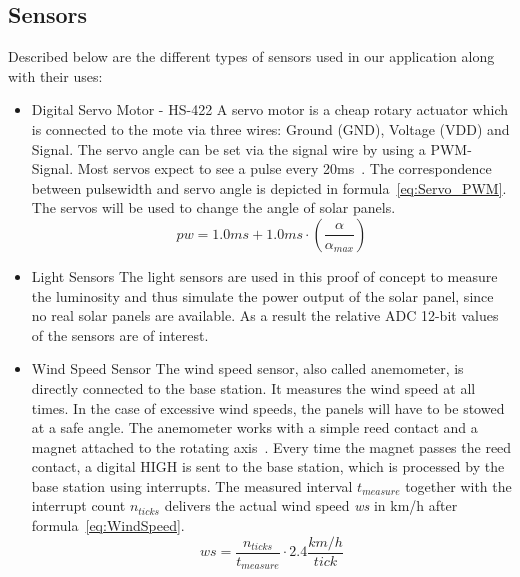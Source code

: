 \documentclass[conference]{IEEEtran}
\begin{document}
\subsection{Sensors}
Described below are the different types of sensors used in our application along with their uses:

\begin{itemize}
    \item Digital Servo Motor - HS-422\cite{servoMotor}\newline
        A servo motor is a cheap rotary actuator which is connected to the mote via three wires: Ground (GND), Voltage (VDD) and Signal. The servo angle can be set via the signal wire by using a PWM-Signal. Most servos expect to see a pulse every 20ms~\cite{howServoworks}. The correspondence between pulsewidth and servo angle is depicted in formula~\eqref{eq:Servo_PWM}. The servos will be used to change the angle of solar panels.
\begin{equation}\label{eq:Servo_PWM}
pw = 1.0ms + 1.0ms \cdot \left(\frac{\alpha}{\alpha_{max}}\right)
\end{equation}

    \item Light Sensors\cite{LightSensor}\newline
        The light sensors are used in this proof of concept to measure the luminosity and thus simulate the power output of the solar panel, since no real solar panels are available. As a result the relative ADC 12-bit values of the sensors are of interest.

    \item Wind Speed Sensor\cite{WindSensor}\newline
        The wind speed sensor, also called anemometer, is directly connected to the base station. It measures the wind speed at all times. In the case of excessive wind speeds, the panels will have to be stowed at a safe angle.\newline
        The anemometer works with a simple reed contact and a magnet attached to the rotating axis~\cite{anemometer}. Every time the magnet passes the reed contact, a digital HIGH is sent to the base station, which is processed by the base station using interrupts. The measured interval $t_{measure}$ together with the interrupt count $n_{ticks}$ delivers the actual wind speed \textit{ws} in km/h after formula~\eqref{eq:WindSpeed}.
        \begin{equation}\label{eq:WindSpeed}
            ws = \frac{n_{ticks}}{t_{measure}} \cdot 2.4 \dfrac{km/h}{tick}
        \end{equation}

\end{itemize}
\end{document}

